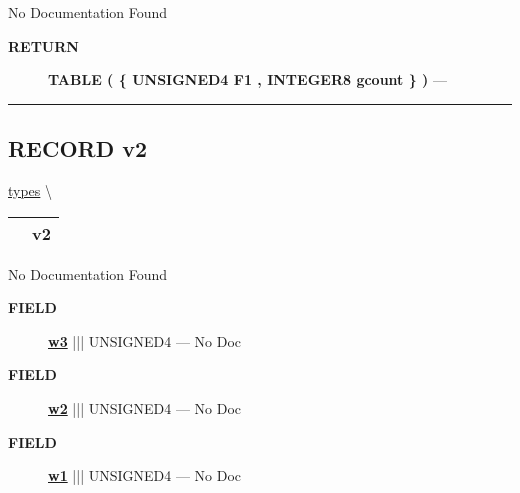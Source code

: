\par





No Documentation Found








\par
\begin{description}
\item [\colorbox{tagtype}{\color{white} \textbf{\textsf{RETURN}}}] \textbf{TABLE ( \{ UNSIGNED4 F1 , INTEGER8 gcount \} )} --- 
\end{description}




\rule{\linewidth}{0.5pt}
\subsection*{\textsf{\colorbox{headtoc}{\color{white} RECORD}
v2}}

\hypertarget{ecldoc:types.v2}{}
\hspace{0pt} \hyperlink{ecldoc:types}{types} \textbackslash 

{\renewcommand{\arraystretch}{1.5}
\begin{tabularx}{\textwidth}{|>{\raggedright\arraybackslash}l|X|}
\hline
\hspace{0pt}\mytexttt{\color{red} } & \textbf{v2} \\
\hline
\end{tabularx}
}

\par





No Documentation Found







\par
\begin{description}
\item [\colorbox{tagtype}{\color{white} \textbf{\textsf{FIELD}}}] \textbf{\underline{w3}} ||| UNSIGNED4 --- No Doc
\item [\colorbox{tagtype}{\color{white} \textbf{\textsf{FIELD}}}] \textbf{\underline{w2}} ||| UNSIGNED4 --- No Doc
\item [\colorbox{tagtype}{\color{white} \textbf{\textsf{FIELD}}}] \textbf{\underline{w1}} ||| UNSIGNED4 --- No Doc
\end{description}





